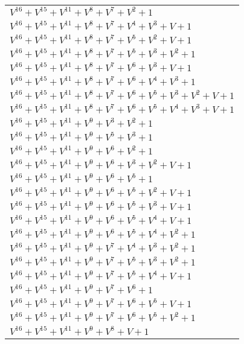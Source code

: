 \documentclass[12pt]{article}
\begin{document}
\begin{adjustwidth}{-4cm}{}
\begin{center}
\begin{longtable}{|l|}
$V^{16}  +V^{15}  +V^{11}  +V^{8}  +V^{7}  +V^{2}  + 1$ \\
$V^{16}  +V^{15}  +V^{11}  +V^{8}  +V^{7}  +V^{4}  +V^{3}  + V + 1$ \\
$V^{16}  +V^{15}  +V^{11}  +V^{8}  +V^{7}  +V^{5}  +V^{2}  + V + 1$ \\
$V^{16}  +V^{15}  +V^{11}  +V^{8}  +V^{7}  +V^{5}  +V^{3}  +V^{2}  + 1$ \\
$V^{16}  +V^{15}  +V^{11}  +V^{8}  +V^{7}  +V^{6}  +V^{3}  + V + 1$ \\
$V^{16}  +V^{15}  +V^{11}  +V^{8}  +V^{7}  +V^{6}  +V^{4}  +V^{3}  + 1$ \\
$V^{16}  +V^{15}  +V^{11}  +V^{8}  +V^{7}  +V^{6}  +V^{5}  +V^{3}  +V^{2}  + V + 1$ \\
$V^{16}  +V^{15}  +V^{11}  +V^{8}  +V^{7}  +V^{6}  +V^{5}  +V^{4}  +V^{3}  + V + 1$ \\
$V^{16}  +V^{15}  +V^{11}  +V^{9}  +V^{3}  +V^{2}  + 1$ \\
$V^{16}  +V^{15}  +V^{11}  +V^{9}  +V^{5}  +V^{3}  + 1$ \\
$V^{16}  +V^{15}  +V^{11}  +V^{9}  +V^{6}  +V^{2}  + 1$ \\
$V^{16}  +V^{15}  +V^{11}  +V^{9}  +V^{6}  +V^{3}  +V^{2}  + V + 1$ \\
$V^{16}  +V^{15}  +V^{11}  +V^{9}  +V^{6}  +V^{5}  + 1$ \\
$V^{16}  +V^{15}  +V^{11}  +V^{9}  +V^{6}  +V^{5}  +V^{2}  + V + 1$ \\
$V^{16}  +V^{15}  +V^{11}  +V^{9}  +V^{6}  +V^{5}  +V^{3}  + V + 1$ \\
$V^{16}  +V^{15}  +V^{11}  +V^{9}  +V^{6}  +V^{5}  +V^{4}  + V + 1$ \\
$V^{16}  +V^{15}  +V^{11}  +V^{9}  +V^{6}  +V^{5}  +V^{4}  +V^{2}  + 1$ \\
$V^{16}  +V^{15}  +V^{11}  +V^{9}  +V^{7}  +V^{4}  +V^{3}  +V^{2}  + 1$ \\
$V^{16}  +V^{15}  +V^{11}  +V^{9}  +V^{7}  +V^{5}  +V^{3}  +V^{2}  + 1$ \\
$V^{16}  +V^{15}  +V^{11}  +V^{9}  +V^{7}  +V^{5}  +V^{4}  + V + 1$ \\
$V^{16}  +V^{15}  +V^{11}  +V^{9}  +V^{7}  +V^{6}  + 1$ \\
$V^{16}  +V^{15}  +V^{11}  +V^{9}  +V^{7}  +V^{6}  +V^{5}  + V + 1$ \\
$V^{16}  +V^{15}  +V^{11}  +V^{9}  +V^{7}  +V^{6}  +V^{5}  +V^{2}  + 1$ \\
$V^{16}  +V^{15}  +V^{11}  +V^{9}  +V^{8}  + V + 1$ \\

\end{longtable}
\end{center}
\end{adjustwidth}
\end{document}
